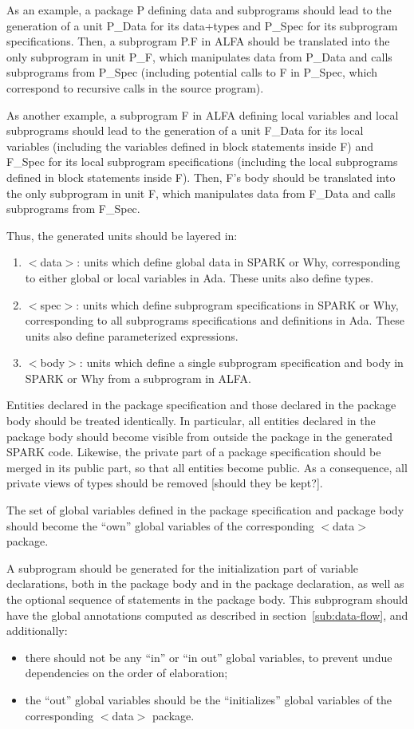 \documentclass{article}
\newcounter{example}
\begin{document}
As an example, a package P defining data and subprograms should lead to the
generation of a unit P\_Data for its data+types and P\_Spec for its subprogram
specifications. Then, a subprogram P.F in ALFA should be translated into the
only subprogram in unit P\_F, which manipulates data from P\_Data and calls
subprograms from P\_Spec (including potential calls to F in P\_Spec, which
correspond to recursive calls in the source program).

As another example, a subprogram F in ALFA defining local variables and local
subprograms should lead to the generation of a unit F\_Data for its local
variables (including the variables defined in block statements inside F) and
F\_Spec for its local subprogram specifications (including the local
subprograms defined in block statements inside F). Then, F's body should be
translated into the only subprogram in unit F, which manipulates data from
F\_Data and calls subprograms from F\_Spec.

Thus, the generated units should be layered in:
\begin{enumerate}
\item $<$data$>$: units which define global data in SPARK or Why, corresponding
  to either global or local variables in Ada. These units also define types.
\item $<$spec$>$: units which define subprogram specifications in SPARK or Why,
  corresponding to all subprograms specifications and definitions in Ada. These
  units also define parameterized expressions.
\item $<$body$>$: units which define a single subprogram specification and body
  in SPARK or Why from a subprogram in ALFA.
\end{enumerate}

Entities declared in the package specification and those declared in the
package body should be treated identically. In particular, all entities
declared in the package body should become visible from outside the package in
the generated SPARK code. Likewise, the private part of a package specification
should be merged in its public part, so that all entities become public. As a
consequence, all private views of types should be removed [should they be
kept?].

The set of global variables defined in the package specification and package
body should become the ``own'' global variables of the corresponding $<$data$>$
package.

A subprogram should be generated for the initialization part of variable
declarations, both in the package body and in the package declaration, as well
as the optional sequence of statements in the package body. This subprogram
should have the global annotations computed as described in
section~\ref{sub:data-flow}, and additionally:
\begin{itemize}
\item there should not be any ``in'' or ``in out'' global variables, to prevent
  undue dependencies on the order of elaboration;
\item the ``out'' global variables should be the ``initializes'' global
  variables of the corresponding $<$data$>$ package.
\end{itemize}
\end{document}
